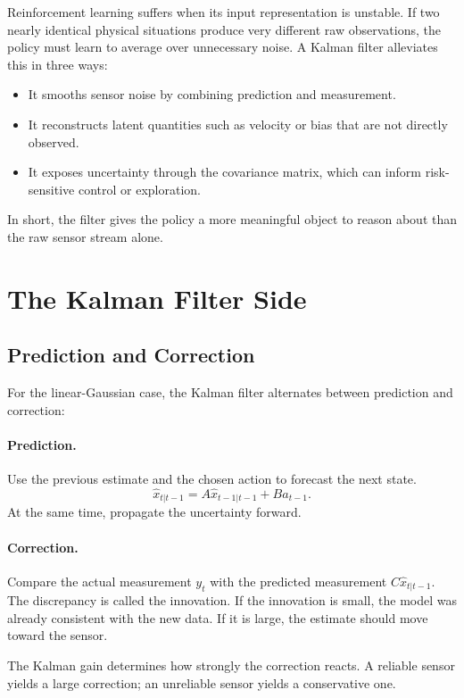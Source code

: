 \documentclass[12pt,a4paper]{article}
\begin{document}
Reinforcement learning suffers when its input representation is unstable. If two nearly identical physical situations produce very different raw observations, the policy must learn to average over unnecessary noise. A Kalman filter alleviates this in three ways:

\begin{itemize}
  \item It smooths sensor noise by combining prediction and measurement.
  \item It reconstructs latent quantities such as velocity or bias that are not directly observed.
  \item It exposes uncertainty through the covariance matrix, which can inform risk-sensitive control or exploration.
\end{itemize}

In short, the filter gives the policy a more meaningful object to reason about than the raw sensor stream alone.

\section{The Kalman Filter Side}

\subsection{Prediction and Correction}

For the linear-Gaussian case, the Kalman filter alternates between prediction and correction:

\paragraph{Prediction.}
Use the previous estimate and the chosen action to forecast the next state.
\[
\hat{x}_{t|t-1} = A \hat{x}_{t-1|t-1} + B a_{t-1}.
\]
At the same time, propagate the uncertainty forward.

\paragraph{Correction.}
Compare the actual measurement \(y_t\) with the predicted measurement \(C\hat{x}_{t|t-1}\). The discrepancy is called the innovation. If the innovation is small, the model was already consistent with the new data. If it is large, the estimate should move toward the sensor.

The Kalman gain determines how strongly the correction reacts. A reliable sensor yields a large correction; an unreliable sensor yields a conservative one.
\end{document}
